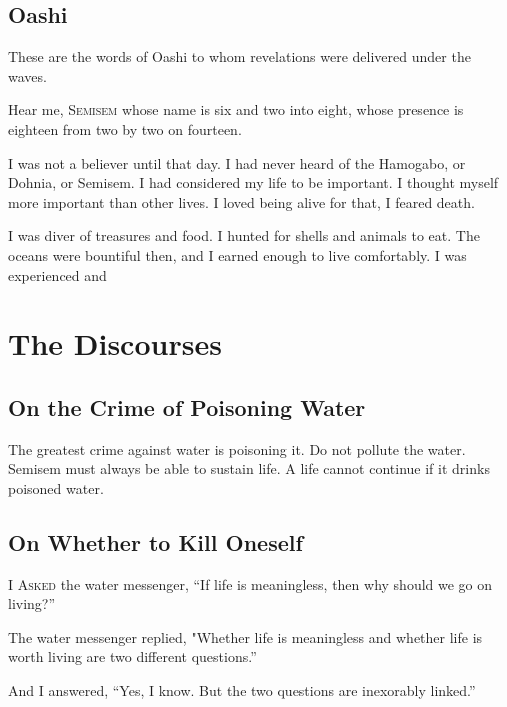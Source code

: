 \documentclass[12pt, letterpaper]{report}
\begin{document}
\chapter{Oashi}

These are the words of Oashi to whom revelations were delivered under the waves.

\vspace{1\baselineskip}
Hear me, S\textsc{emisem} whose name is six and two into eight, whose presence is eighteen from two by two on fourteen.


\vspace{1\baselineskip}
I was not a believer until that day. I had never heard of the Hamogabo, or Dohnia, or Semisem. I had considered my life to be important. I thought myself more important than other lives. I loved being alive for that, I feared death.

\vspace{1\baselineskip}
I was diver of treasures and food. I hunted for shells and animals to eat. The oceans were bountiful then, and I earned enough to live comfortably. I was experienced and 

\part{The Discourses}

\chapter{On the Crime of Poisoning Water}

The greatest crime against water is poisoning it. Do not pollute the water. Semisem must always be able to sustain life. A life cannot continue if it drinks poisoned water. 

\chapter{On Whether to Kill Oneself}

\vspace{1\baselineskip}
I A\textsc{sked} the water messenger, ``If life is meaningless, then why should we go on living?''

\vspace{1\baselineskip}
The water messenger replied, "Whether life is meaningless and whether life is worth living are two different questions.''

\vspace{1\baselineskip}
And I answered, ``Yes, I know. But the two questions are inexorably linked.''
\end{document}
